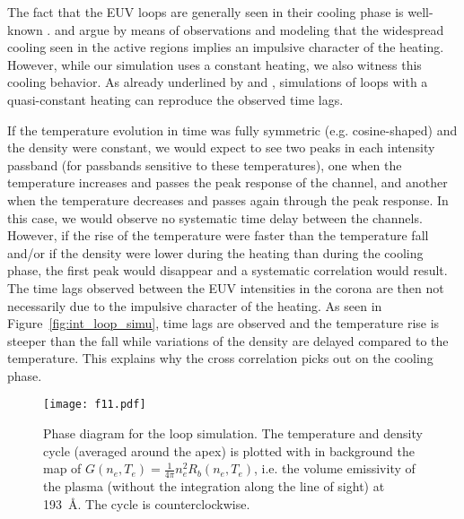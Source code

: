 \documentclass[preprint2]{aastex6}
\begin{document}
The fact that the EUV loops are generally seen in their cooling phase is well-known \citep[e.g.][]{warren2002, winebarger2003, winebarger_warren2005, ugarte-urra2006, ugarte-urra2009, mulu-moore2011, viall&klimchuk2011}. \citet{viall&klimchuk2012} and \citet{viall&klimchuk2013} argue by means of observations and modeling that the widespread cooling seen in the active regions implies an impulsive character of the heating. However, while our simulation uses a constant heating, we also witness this cooling behavior. As already underlined by \citet{lionello2013} and \citet{lionello2016}, simulations of loops with a quasi-constant heating can reproduce the observed time lags. 

\medskip

If the temperature evolution in time was fully symmetric (e.g. cosine-shaped) and the density were constant, we would expect to see two peaks in each intensity passband (for passbands sensitive to these temperatures), one when the temperature increases and passes the peak response of the channel, and another when the temperature decreases and passes again through the peak response. In this case, we would observe no systematic time delay between the channels. However, if the rise of the temperature were faster than the temperature fall and/or if the density were lower during the heating than during the cooling phase, the first peak would disappear and a systematic correlation would result. The time lags observed between the EUV intensities in the corona are then not necessarily due to the impulsive character of the heating. As seen in Figure~\ref{fig:int_loop_simu}, time lags are observed and the temperature rise is steeper than the fall while variations of the density are delayed compared to the temperature. This explains why the cross correlation picks out on the cooling phase.

	\begin{figure}
		\centering
                 \texttt{[image: f11.pdf]}
                 \caption{Phase diagram for the loop simulation. The temperature and density cycle (averaged around the apex) is plotted with in background the map of $G(n_e,T_e)=\frac{1}{4\pi} n_e^2 R_b(n_e,T_e) $, i.e. the volume emissivity of the plasma (without the integration along the line of sight) at 193~\AA. The cycle is counterclockwise.}
                 \label{fig:space_int_loop_simu}
	\end{figure}
	
\end{document}
